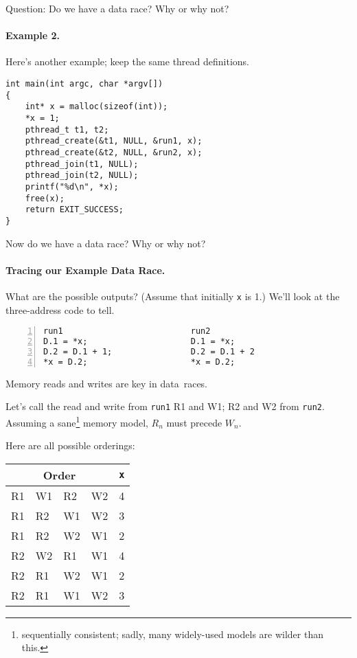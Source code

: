\documentclass[11pt]{article}
\begin{document}
\noindent
Question: Do we have a data race? Why or why not?
\vspace*{2em}

\paragraph{Example 2.} Here's another example; keep the same thread definitions.
\begin{lstlisting}
int main(int argc, char *argv[])
{
    int* x = malloc(sizeof(int));
    *x = 1;
    pthread_t t1, t2;
    pthread_create(&t1, NULL, &run1, x);
    pthread_create(&t2, NULL, &run2, x);
    pthread_join(t1, NULL);
    pthread_join(t2, NULL);
    printf("%d\n", *x);
    free(x);
    return EXIT_SUCCESS;
}
\end{lstlisting}

Now do we have a data race? Why or why not?
\vspace*{2em}


\paragraph{Tracing our Example Data Race.} 
What are the possible outputs? (Assume that initially {\tt *x} is 1.)
We'll look at the three-address code to tell.

\hspace*{.2\textwidth}\begin{minipage}{.8\textwidth}
\begin{lstlisting}[numbers=left]
run1                          run2   
D.1 = *x;                     D.1 = *x;
D.2 = D.1 + 1;                D.2 = D.1 + 2
*x = D.2;                     *x = D.2;
  \end{lstlisting}
\end{minipage}

Memory reads and writes are key in data~races.

Let's call the read and write from {\tt run1} R1 and W1; R2 and W2
from {\tt run2}. Assuming a sane\footnote{sequentially consistent; sadly, many
widely-used models are wilder than this.}
memory model, $R_n$ must precede $W_n$.

\newpage
Here are all possible orderings:
  \begin{center}
    \begin{tabular}{llll|l}
\multicolumn{4}{c|}{Order} & {\tt *x}\\
\hline
R1 & W1 & R2 & W2 & 4 \\
R1 & R2 & W1 & W2 & 3 \\
R1 & R2 & W2 & W1 & 2 \\
R2 & W2 & R1 & W1 & 4 \\
R2 & R1 & W2 & W1 & 2 \\
R2 & R1 & W1 & W2 & 3 \\
    \end{tabular}
  \end{center}
\end{document}
